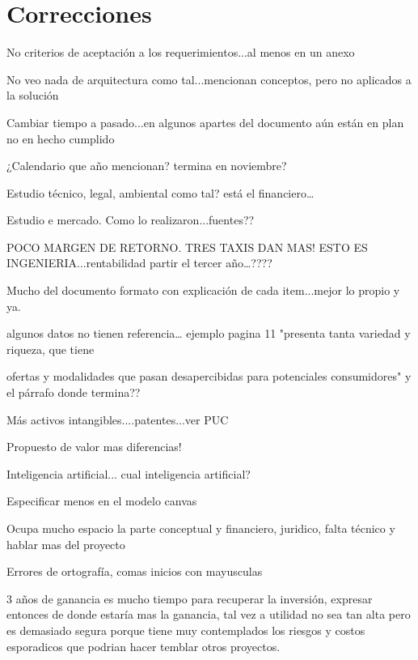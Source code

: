\section{Correcciones}


No criterios de aceptación a los requerimientos...al menos en un anexo

No veo nada de arquitectura como tal...mencionan conceptos, pero no aplicados a la solución

Cambiar tiempo a pasado...en algunos apartes del documento aún están en plan no en hecho cumplido

¿Calendario que año mencionan? termina en noviembre?

Estudio técnico, legal, ambiental como tal? está el financiero…

Estudio e mercado. Como lo realizaron...fuentes??

POCO MARGEN DE RETORNO. TRES TAXIS DAN MAS! ESTO ES INGENIERIA...rentabilidad partir el tercer año…????

Mucho del documento formato con explicación de cada item...mejor lo propio y ya.

algunos datos no tienen referencia… ejemplo pagina 11 "presenta tanta variedad y riqueza, que tiene

 ofertas y modalidades que pasan desapercibidas para potenciales consumidores" y el párrafo donde termina??

Más activos intangibles....patentes...ver PUC

Propuesto de valor mas diferencias! 

Inteligencia artificial... cual inteligencia artificial?

Especificar menos en el modelo canvas

Ocupa mucho espacio la parte conceptual y financiero, juridico, falta técnico y hablar mas del proyecto

Errores de ortografía, comas inicios con mayusculas

3 años de ganancia es mucho tiempo para recuperar la inversión, expresar entonces de donde estaría mas la ganancia, tal vez a utilidad no sea tan alta pero es demasiado segura porque tiene muy contemplados los riesgos y costos esporadicos que podrian hacer temblar otros proyectos. 